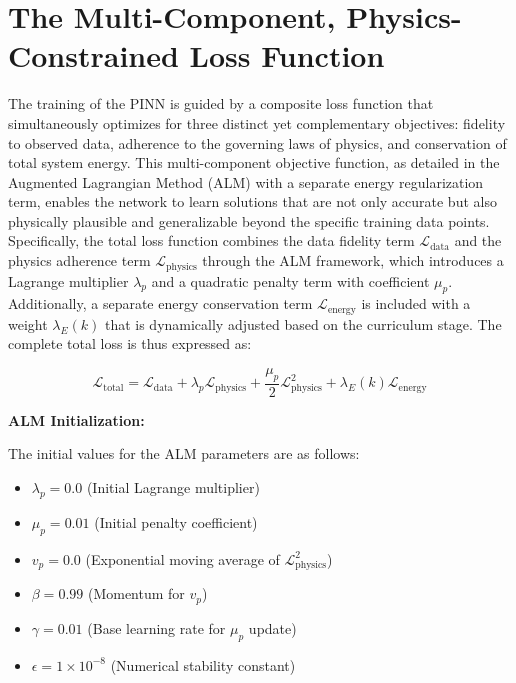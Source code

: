 \section{The Multi-Component, Physics-Constrained Loss Function}

The training of the PINN is guided by a composite loss function that simultaneously optimizes for three distinct yet complementary objectives:
fidelity to observed data, adherence to the governing laws of physics, and conservation of total system energy.
This multi-component objective function,
as detailed in the Augmented Lagrangian Method (ALM) with a separate energy regularization term, enables the network to learn solutions that are not only accurate
but also physically plausible and generalizable beyond the specific training data points.
Specifically, the total loss function combines the data fidelity term $\mathcal{L}_{\text{data}}$ and the physics adherence term $\mathcal{L}_{\text{physics}}$
through the ALM framework, which introduces a Lagrange multiplier $\lambda_p$ and a quadratic penalty term with coefficient $\mu_p$.
Additionally, a separate energy conservation term $\mathcal{L}_{\text{energy}}$ is included with a weight $\lambda_E(k)$ that is dynamically
adjusted based on the curriculum stage.
The complete total loss is thus expressed as:

\begin{equation}
\mathcal{L}_{\text{total}} = \mathcal{L}_{\text{data}} + \lambda_p \mathcal{L}_{\text{physics}} + \frac{\mu_p}{2} \mathcal{L}_{\text{physics}}^2 + \lambda_E(k) \mathcal{L}_{\text{energy}}
\end{equation}


\textbf{ALM Initialization:}

The initial values for the ALM parameters are as follows:

\begin{itemize}
    \item $\lambda_p = 0.0$ \hspace{1em} (Initial Lagrange multiplier)
    \item $\mu_p = 0.01$ \hspace{1em} (Initial penalty coefficient)
    \item $v_p = 0.0$ \hspace{1em} (Exponential moving average of $\mathcal{L}_{\text{physics}}^2$)
    \item $\beta = 0.99$ \hspace{1em} (Momentum for $v_p$)
    \item $\gamma = 0.01$ \hspace{1em} (Base learning rate for $\mu_p$ update)
    \item $\epsilon = 1 \times 10^{-8}$ \hspace{1em} (Numerical stability constant)
\end{itemize}

